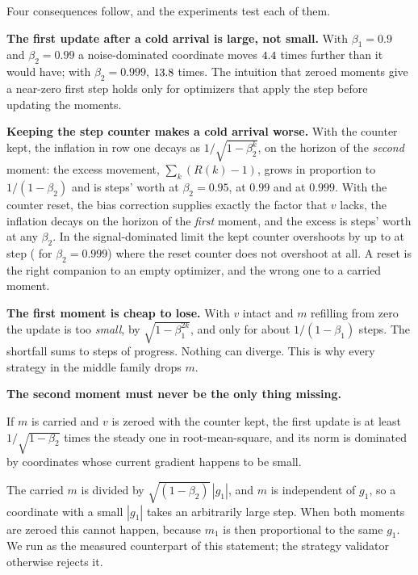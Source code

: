 Four consequences follow, and the experiments test each of them.

\textbf{The first update after a cold arrival is large, not small.} With $\beta_1 = 0.9$ and $\beta_2 = 0.99$ a
noise-dominated coordinate moves $4.4$ times further than it would have; with $\beta_2 = 0.999$,
$13.8$ times. The intuition that zeroed moments give a near-zero first step holds only for optimizers that
apply the step before updating the moments.

\textbf{Keeping the step counter makes a cold arrival worse.} With the counter kept, the inflation in row one decays as
$1/\sqrt{1-\beta_2^k}$, on the horizon of the \emph{second} moment: the excess movement, $\sum_k (R(k)-1)$, grows in
proportion to $1/(1-\beta_2)$ and is \excessZerosC{} steps' worth at $\beta_2 = 0.95$, \excessZerosA{} at $0.99$
and \excessZerosB{} at $0.999$. With the counter
reset, the bias correction supplies exactly the factor that $v$ lacks, the inflation decays on the horizon of the
\emph{first} moment, and the excess is \excessFreshA{} steps' worth at any $\beta_2$. In the signal-dominated limit
the kept counter overshoots by up to \overshootA{} at step \overshootAtA{} (\overshootB{} for $\beta_2 = 0.999$) where
the reset counter does not overshoot at all. A reset is the right companion to an empty optimizer, and the wrong one to
a carried moment.

\textbf{The first moment is cheap to lose.} With $v$ intact and $m$ refilling from zero the update is too
\emph{small}, by $\sqrt{1-\beta_1^{2k}}$, and only for about $1/(1-\beta_1)$ steps. The shortfall sums to
 steps of progress. Nothing can diverge. This is why every strategy in the middle family drops $m$.

\textbf{The second moment must never be the only thing missing.}

\begin{corollary}
\label{cor:wm}
If $m$ is carried and $v$ is zeroed with the counter kept, the first update is at least $1/\sqrt{1-\beta_2}$ times the
steady one in root-mean-square, and its norm is dominated by coordinates whose current gradient happens to be small.
\end{corollary}

\noindent The carried $m$ is divided by $\sqrt{(1-\beta_2)}\,|g_1|$, and $m$ is independent of $g_1$, so a coordinate
with a small $|g_1|$ takes an arbitrarily large step. When both moments are zeroed this cannot happen, because $m_1$ is
then proportional to the same $g_1$. We run  as the measured counterpart of this statement; the
strategy validator otherwise rejects it.

